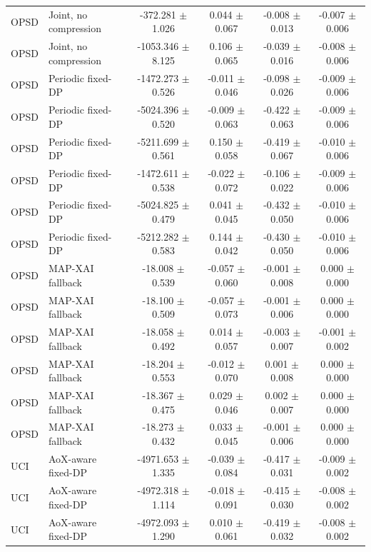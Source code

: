 \begin{tabular}{llcccc}
OPSD & Joint, no compression & -372.281 $\pm$ 1.026 & 0.044 $\pm$ 0.067 & -0.008 $\pm$ 0.013 & -0.007 $\pm$ 0.006 \\
OPSD & Joint, no compression & -1053.346 $\pm$ 8.125 & 0.106 $\pm$ 0.065 & -0.039 $\pm$ 0.016 & -0.008 $\pm$ 0.006 \\
OPSD & Periodic fixed-DP & -1472.273 $\pm$ 0.526 & -0.011 $\pm$ 0.046 & -0.098 $\pm$ 0.026 & -0.009 $\pm$ 0.006 \\
OPSD & Periodic fixed-DP & -5024.396 $\pm$ 0.520 & -0.009 $\pm$ 0.063 & -0.422 $\pm$ 0.063 & -0.009 $\pm$ 0.006 \\
OPSD & Periodic fixed-DP & -5211.699 $\pm$ 0.561 & 0.150 $\pm$ 0.058 & -0.419 $\pm$ 0.067 & -0.010 $\pm$ 0.006 \\
OPSD & Periodic fixed-DP & -1472.611 $\pm$ 0.538 & -0.022 $\pm$ 0.072 & -0.106 $\pm$ 0.022 & -0.009 $\pm$ 0.006 \\
OPSD & Periodic fixed-DP & -5024.825 $\pm$ 0.479 & 0.041 $\pm$ 0.045 & -0.432 $\pm$ 0.050 & -0.010 $\pm$ 0.006 \\
OPSD & Periodic fixed-DP & -5212.282 $\pm$ 0.583 & 0.144 $\pm$ 0.042 & -0.430 $\pm$ 0.050 & -0.010 $\pm$ 0.006 \\
OPSD & MAP-XAI fallback & -18.008 $\pm$ 0.539 & -0.057 $\pm$ 0.060 & -0.001 $\pm$ 0.008 & 0.000 $\pm$ 0.000 \\
OPSD & MAP-XAI fallback & -18.100 $\pm$ 0.509 & -0.057 $\pm$ 0.073 & -0.001 $\pm$ 0.006 & 0.000 $\pm$ 0.000 \\
OPSD & MAP-XAI fallback & -18.058 $\pm$ 0.492 & 0.014 $\pm$ 0.057 & -0.003 $\pm$ 0.007 & -0.001 $\pm$ 0.002 \\
OPSD & MAP-XAI fallback & -18.204 $\pm$ 0.553 & -0.012 $\pm$ 0.070 & 0.001 $\pm$ 0.008 & 0.000 $\pm$ 0.000 \\
OPSD & MAP-XAI fallback & -18.367 $\pm$ 0.475 & 0.029 $\pm$ 0.046 & 0.002 $\pm$ 0.007 & 0.000 $\pm$ 0.000 \\
OPSD & MAP-XAI fallback & -18.273 $\pm$ 0.432 & 0.033 $\pm$ 0.045 & -0.001 $\pm$ 0.006 & 0.000 $\pm$ 0.000 \\
UCI & AoX-aware fixed-DP & -4971.653 $\pm$ 1.335 & -0.039 $\pm$ 0.084 & -0.417 $\pm$ 0.031 & -0.009 $\pm$ 0.002 \\
UCI & AoX-aware fixed-DP & -4972.318 $\pm$ 1.114 & -0.018 $\pm$ 0.091 & -0.415 $\pm$ 0.030 & -0.008 $\pm$ 0.002 \\
UCI & AoX-aware fixed-DP & -4972.093 $\pm$ 1.290 & 0.010 $\pm$ 0.061 & -0.419 $\pm$ 0.032 & -0.008 $\pm$ 0.002 \\

\end{tabular}
